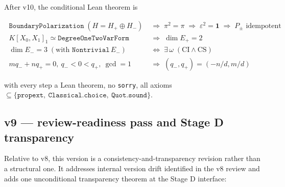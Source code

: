 \documentclass[11pt,a4paper]{article}
\begin{document}
\smallskip
After v10, the conditional Lean theorem is

\[
\boxed{\;
\begin{aligned}
\texttt{BoundaryPolarization}\;(H = H_+ \oplus H_-)
&\;\Rightarrow\; \pi^2 = \pi
\;\Rightarrow\; \varepsilon^2 = \mathbf 1
\;\Rightarrow\; P_\pm \text{ idempotent} \\
K[X_0, X_1]_1 \simeq \texttt{DegreeOneTwoVarForm}
&\;\Rightarrow\; \dim E_+ = 2 \\
\dim E_- = 3\;(\text{with }\texttt{Nontrivial}\,E_-)
&\;\iff\; \exists\,\omega\;(\textrm{CI} \wedge \textrm{CS}) \\
m q_- + n q_+ = 0,\ q_- < 0 < q_+,\ \gcd = 1
&\;\Rightarrow\; (q_-, q_+) = (-n/d, m/d)
\end{aligned}
\;}
\]

with every step a Lean theorem, no \texttt{sorry}, all axioms
$\subseteq\{\texttt{propext},\ \texttt{Classical.choice},\
\texttt{Quot.sound}\}$.

\subsection*{v9 --- review-readiness pass and Stage D transparency}

Relative to v8, this version is a consistency-and-transparency
revision rather than a structural one. It addresses internal
version drift identified in the v8 review and adds one
unconditional transparency theorem at the Stage D interface:
\end{document}
